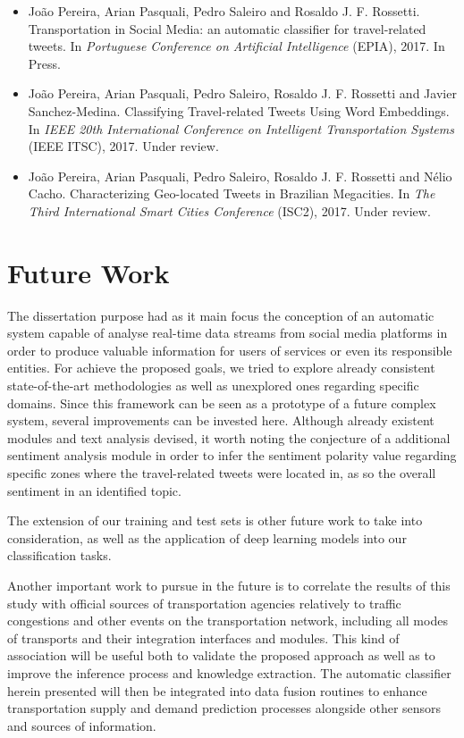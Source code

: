 \begin{itemize}
	\item
	João Pereira, Arian Pasquali, Pedro Saleiro and Rosaldo J. F. Rossetti. {\color{blue}Transportation in Social Media: an automatic classifier for travel-related tweets}. In \emph{Portuguese Conference on Artificial Intelligence} (EPIA), 2017. In Press.
	
	\item
	João Pereira, Arian Pasquali, Pedro Saleiro, Rosaldo J. F. Rossetti and Javier Sanchez-Medina. {\color{blue}Classifying Travel-related Tweets Using Word Embeddings}. In \emph{IEEE 20th International Conference on Intelligent Transportation Systems} (IEEE ITSC), 2017. Under review.
	
	\item
	João Pereira, Arian Pasquali, Pedro Saleiro, Rosaldo J. F. Rossetti and Nélio Cacho. {\color{blue}Characterizing Geo-located Tweets in Brazilian Megacities}. In \emph{The Third International Smart Cities Conference} (ISC2), 2017. Under review.
\end{itemize}

\section{Future Work}

The dissertation purpose had as it main focus the conception of an automatic system capable of analyse real-time data streams from social media platforms in order to produce valuable information for users of services or even its responsible entities. For achieve the proposed goals, we tried to explore already consistent state-of-the-art methodologies as well as unexplored ones regarding specific domains. Since this framework can be seen as a prototype of a future complex system, several improvements can be invested here. Although already existent modules and text analysis devised, it worth noting the conjecture of a additional sentiment analysis module in order to infer the sentiment polarity value regarding specific zones where the travel-related tweets were located in, as so the overall sentiment in an identified topic.

The extension of our training and test sets is other future work to take into consideration, as well as the application of deep learning models into our classification tasks.

Another important work to pursue in the future is to correlate the results of this study with official sources of transportation agencies relatively to traffic congestions and other events on the transportation network, including all modes of transports and their integration interfaces and modules. This kind of association will be useful both to validate the proposed approach as well as to improve the inference process and knowledge extraction. The automatic classifier herein presented will then be integrated into data fusion routines to enhance transportation supply and demand prediction processes alongside other sensors and sources of information.

